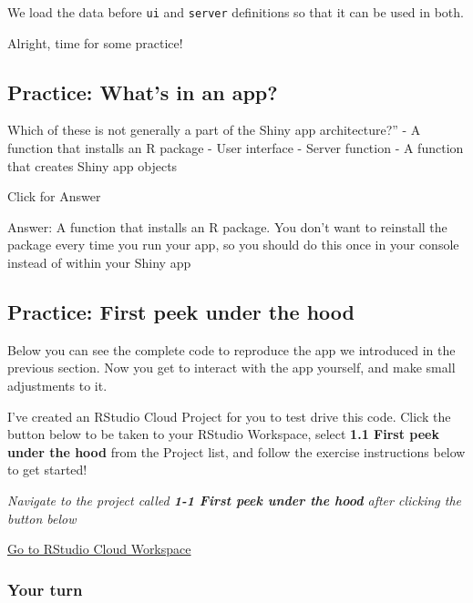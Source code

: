 \documentclass[
  letterpaper,
  DIV=11,
  numbers=noendperiod]{scrreprt}
\begin{document}
We load the data before \texttt{ui} and \texttt{server} definitions so
that it can be used in both.

Alright, time for some practice!

\hypertarget{practice-whats-in-an-app}{%
\subsection{Practice: What's in an
app?}\label{practice-whats-in-an-app}}

Which of these is not generally a part of the Shiny app architecture?''
- A function that installs an R package - User interface - Server
function - A function that creates Shiny app objects

Click for Answer

Answer: A function that installs an R package. You don't want to
reinstall the package every time you run your app, so you should do this
once in your console instead of within your Shiny app

\hypertarget{practice-first-peek-under-the-hood}{%
\subsection{Practice: First peek under the
hood}\label{practice-first-peek-under-the-hood}}

Below you can see the complete code to reproduce the app we introduced
in the previous section. Now you get to interact with the app yourself,
and make small adjustments to it.

I've created an RStudio Cloud Project for you to test drive this code.
Click the button below to be taken to your RStudio Workspace, select
\textbf{1.1 First peek under the hood} from the Project list, and follow
the exercise instructions below to get started!

\emph{Navigate to the project called \textbf{1-1 First peek under the
hood} after clicking the button below}

\href{https://rstudio.cloud/spaces/81721/join?access_code=I4VJaNsKfTqR3Td9hLP7E1nz8\%2FtMg6Xbw9Bgqumv}{
Go to RStudio Cloud Workspace}

\hypertarget{your-turn}{%
\subsubsection{Your turn}\label{your-turn}}
\end{document}
